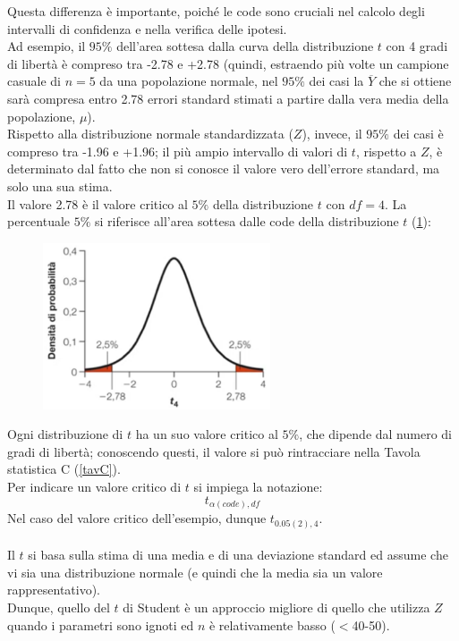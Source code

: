 \documentclass[10pt, draft]{book}
\begin{document}
Questa differenza è importante, poiché le code sono cruciali nel calcolo degli intervalli di confidenza e nella verifica delle ipotesi.
\\
Ad esempio, il $95\%$ dell'area sottesa dalla curva della distribuzione $t$ con 4 gradi di libertà è compreso tra -2.78 e +2.78 (quindi, estraendo più volte un campione casuale di $n = 5$ da una popolazione normale, nel $95\%$ dei casi la $\overline{Y}$ che si ottiene sarà compresa entro 2.78 errori standard stimati a partire dalla vera media della popolazione, $\mu$).
\\
Rispetto alla distribuzione normale standardizzata ($Z$), invece, il $95\%$ dei casi è compreso tra -1.96 e +1.96; il più ampio intervallo di valori di $t$, rispetto a $Z$, è determinato dal fatto che non si conosce il valore vero dell'errore standard, ma solo una sua stima.
\\
Il valore 2.78 è il valore critico al $5\%$ della distribuzione $t$ con $df = 4$. La percentuale $5\%$ si riferisce all'area sottesa dalle code della distribuzione $t$ (\ref{fig11.1-2}):
\begin{figure}[H]\label{fig11.1-2}
    \centering
    \includegraphics[width=0.6\textwidth]{fig11.1-2}
    \caption{\small{}}
    \end{figure}
Ogni distribuzione di $t$ ha un suo valore critico al $5\%$, che dipende dal numero di gradi di libertà; conoscendo questi, il valore si può rintracciare nella Tavola statistica C (\ref{tavC}).
\\
Per indicare un valore critico di $t$ si impiega la notazione:
\begin{equation}
    t_{\alpha(code),df}
\end{equation}
Nel caso del valore critico dell'esempio, dunque $t_{0.05(2),4}$.
\\
\\
Il $t$ si basa sulla stima di una media e di una deviazione standard ed assume che vi sia una distribuzione normale (e quindi che la media sia un valore rappresentativo).
\\
Dunque, quello del $t$ di Student è un approccio migliore di quello che utilizza $Z$ quando i parametri sono ignoti ed $n$ è relativamente basso ($<$40-50).
\end{document}
